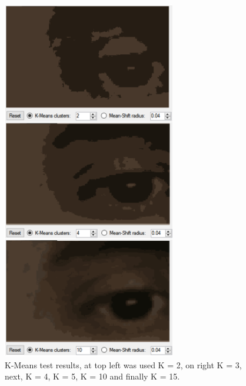 \documentclass[10pt, conference]{IEEEtran}
\begin{document}
\begin{figure}[t]
	\centering
	\includegraphics{figures/pic14.png}
    \caption{K-Means test results, at top left was used K = 2, on right K = 3, next, K = 4, K = 5, K = 10 and finally K = 15.}
    \label{fig:fig13}
\end{figure}

\cite{Sibgrapi2016}



\end{document}
